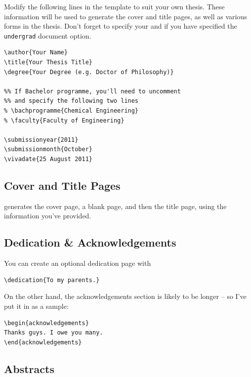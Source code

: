 \documentclass[a4paper,nofonts,raggedright,titlepage,openany]{tufte-book}
\begin{document}
Modify the following lines in the template to suit your own thesis. These information will be used to generate the cover and title pages, as well as various forms in the thesis. Don't forget to specify your \texttt{\faculty} and \texttt{\bachprogramme} if you have specified the \texttt{undergrad} document option.

\begin{verbatim}
\author{Your Name}
\title{Your Thesis Title}
\degree{Your Degree (e.g. Doctor of Philosophy)}

%% If Bachelor programme, you'll need to uncomment 
%% and specify the following two lines
% \bachprogramme{Chemical Engineering}
% \faculty{Faculty of Engineering}

\submissionyear{2011}
\submissionmonth{October}
\vivadate{25 August 2011}
\end{verbatim}


\subsection{Cover and Title Pages}

\texttt{\makecoverandtitlepage} generates the cover page,  a blank page, and then the title page, using the information you've provided.

\subsection{Dedication \& Acknowledgements}

You can create an optional dedication page with 
\begin{verbatim}
\dedication{To my parents.}
\end{verbatim}

On the other hand, the acknowledgements section is likely to be longer -- so I've put it in  as a sample:

\begin{verbatim}
\begin{acknowledgements}
Thanks guys. I owe you many.
\end{acknowledgements}
\end{verbatim}

\subsection{Abstracts}
\end{document}
